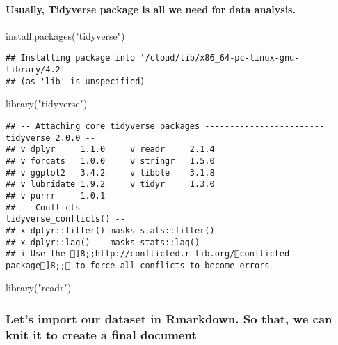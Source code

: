 \documentclass[
]{article}
\newenvironment{Shaded}{\begin{snugshade}}{\end{snugshade}}
\newcommand{\FunctionTok}[1]{\textcolor[rgb]{0.00,0.00,0.00}{#1}}
\newcommand{\NormalTok}[1]{#1}
\newcommand{\StringTok}[1]{\textcolor[rgb]{0.31,0.60,0.02}{#1}}
\begin{document}
\hypertarget{usually-tidyverse-package-is-all-we-need-for-data-analysis.}{%
\paragraph{Usually, Tidyverse package is all we need for data
analysis.}\label{usually-tidyverse-package-is-all-we-need-for-data-analysis.}}

\begin{Shaded}
\begin{Highlighting}[]
\FunctionTok{install.packages}\NormalTok{(}\StringTok{"tidyverse"}\NormalTok{)}
\end{Highlighting}
\end{Shaded}

\begin{verbatim}
## Installing package into '/cloud/lib/x86_64-pc-linux-gnu-library/4.2'
## (as 'lib' is unspecified)
\end{verbatim}

\begin{Shaded}
\begin{Highlighting}[]
\FunctionTok{library}\NormalTok{(}\StringTok{"tidyverse"}\NormalTok{)}
\end{Highlighting}
\end{Shaded}

\begin{verbatim}
## -- Attaching core tidyverse packages ------------------------ tidyverse 2.0.0 --
## v dplyr     1.1.0     v readr     2.1.4
## v forcats   1.0.0     v stringr   1.5.0
## v ggplot2   3.4.2     v tibble    3.1.8
## v lubridate 1.9.2     v tidyr     1.3.0
## v purrr     1.0.1     
## -- Conflicts ------------------------------------------ tidyverse_conflicts() --
## x dplyr::filter() masks stats::filter()
## x dplyr::lag()    masks stats::lag()
## i Use the ]8;;http://conflicted.r-lib.org/conflicted package]8;; to force all conflicts to become errors
\end{verbatim}

\begin{Shaded}
\begin{Highlighting}[]
\FunctionTok{library}\NormalTok{(}\StringTok{"readr"}\NormalTok{)}
\end{Highlighting}
\end{Shaded}

\hypertarget{lets-import-our-dataset-in-rmarkdown.-so-that-we-can-knit-it-to-create-a-final-document}{%
\subsubsection{Let's import our dataset in Rmarkdown. So that, we can
knit it to create a final
document}\label{lets-import-our-dataset-in-rmarkdown.-so-that-we-can-knit-it-to-create-a-final-document}}
\end{document}
